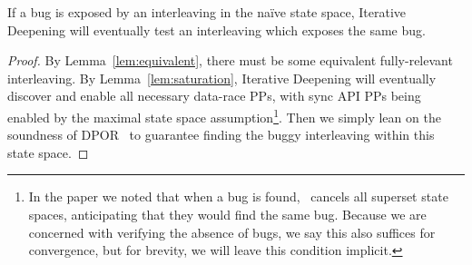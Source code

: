 \setcounter{theorem}{1}
\begin{theorem}
	If a bug is exposed by an interleaving in the na\"{i}ve state space, Iterative Deepening will eventually test an interleaving which exposes the same bug.
\end{theorem}

\begin{proof}
By Lemma~\ref{lem:equivalent}, there must be some equivalent fully-relevant interleaving.
By Lemma~\ref{lem:saturation}, Iterative Deepening will eventually discover and enable all necessary data-race PPs, with sync API PPs being enabled by the maximal state space assumption\footnote{
		In the paper we noted that when a bug is found, \quicksand~cancels all superset state spaces, anticipating that they would find the same bug.
		Because we are concerned with verifying the absence of bugs, we say this also suffices for convergence, but for brevity, we will leave this condition implicit.}.
Then we simply lean on the soundness of DPOR~\cite{dpor} to guarantee finding the buggy interleaving within this state space.
\end{proof}
